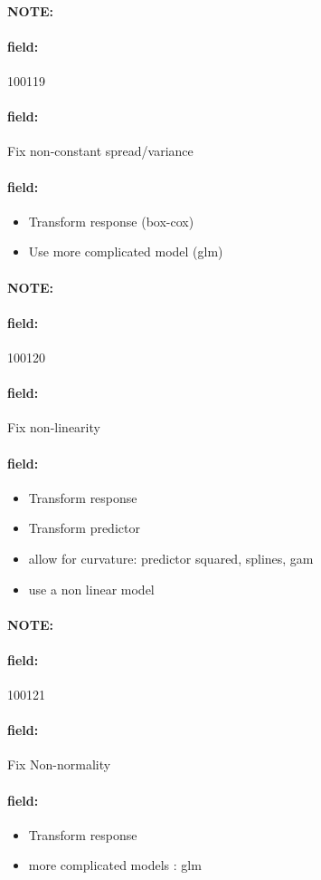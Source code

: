 \documentclass[12pt]{article}
\newenvironment{note}{\paragraph{NOTE:}}{}
\newenvironment{field}{\paragraph{field:}}{}
\begin{document}
\begin{note} \begin{field} \tiny 100119 \end{field}
 \begin{field}
  Fix non-constant spread/variance
 \end{field}
 \begin{field}
  \begin{itemize}
   \item Transform response (box-cox)
   \item Use more complicated model (glm)
  \end{itemize}
 \end{field}
\end{note}

\begin{note} \begin{field} \tiny 100120 \end{field}
 \begin{field}
  Fix non-linearity
 \end{field}
 \begin{field}
  \begin{itemize}
   \item Transform response
   \item Transform predictor
   \item allow for curvature: predictor squared, splines, gam
   \item use a non linear model
  \end{itemize}
 \end{field}
\end{note}

\begin{note} \begin{field} \tiny 100121 \end{field}
 \begin{field}
  Fix Non-normality
 \end{field}
 \begin{field}
  \begin{itemize}
   \item Transform response
   \item more complicated models : glm
  \end{itemize}
 \end{field}
\end{note}
\end{document}
